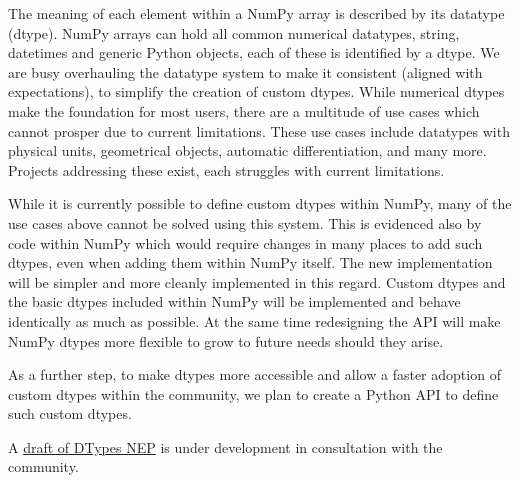 \documentclass[fleqn,10pt]{wlscirep}
\begin{document}


The meaning of each element within a NumPy array is described by its datatype
(dtype). NumPy arrays can hold all common numerical datatypes, string, datetimes
and generic Python objects, each of these is identified by a dtype.
We are busy overhauling the datatype system to make it consistent (aligned with
expectations), to simplify the creation of custom dtypes.
While numerical dtypes make the foundation for most users, there are
a multitude of use cases which cannot prosper due to current limitations.
These use cases include datatypes with physical units\cite{astropy,Goldbaum2018,pint},
geometrical objects\cite{pygeos}, automatic differentiation\cite{pyadolc}, and many more.
Projects addressing these exist, each struggles with current
limitations.  %

While it is currently possible to define custom dtypes within NumPy, many of the
use cases above cannot be solved using this system.
This is evidenced also by code within NumPy which would require changes
in many places to add such dtypes, even when adding them within NumPy itself.
The new implementation will be simpler and more cleanly implemented in
this regard.
Custom dtypes and the basic dtypes included within NumPy will be implemented
and behave identically as much as possible.
At the same time redesigning the API will make NumPy dtypes more flexible to grow
to future needs should they arise.

As a further step, to make dtypes more accessible and allow a faster adoption of
custom dtypes within the community, we plan to create a Python API to
define such custom dtypes.

A \href{https://github.com/numpy/numpy/pull/14422}{draft of DTypes NEP}
is under development in consultation with the community.


\end{document}
